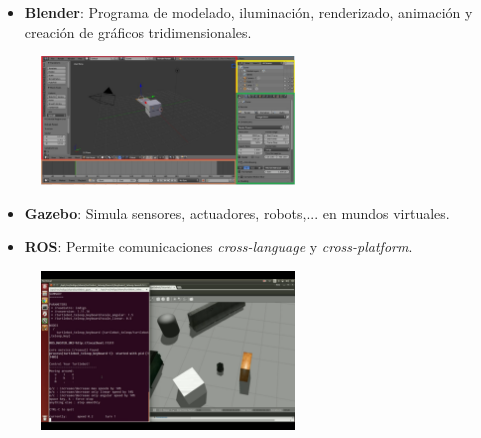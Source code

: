 \documentclass[notes,slidesec,a4]{seminar}
\begin{document}
\begin{hslide}
	\begin{itemize}
		\item \textbf{Blender}: Programa de modelado, iluminación, renderizado, animación y creación de gráficos tridimensionales.
	\end{itemize}
	\begin{center}
		\begin{figure}
			\includegraphics[width=0.6\textwidth]{InterfazBlender01.png}
		\end{figure}
	\end{center}
\end{hslide}

\begin{hslide}
	\begin{itemize}
		\item \textbf{Gazebo}: Simula sensores, actuadores, robots,... en mundos virtuales.
		\item \textbf{ROS}: Permite comunicaciones \textit{cross-language} y \textit{cross-platform}.
	\end{itemize}
	\begin{center}
		\begin{figure}
			\includegraphics[width=0.6\textwidth]{ros.png}
		\end{figure}
	\end{center}
\end{hslide}
\end{document}
